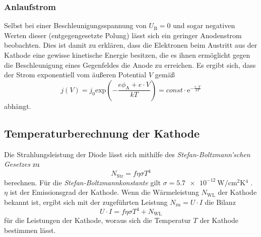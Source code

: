 \subsubsection{Anlaufstrom}
Selbst bei einer Beschleunigungsspannung von $U_\text{B} = 0$ und sogar negativen Werten dieser (entgegengesetzte Polung) lässt sich ein geringer Anodenstrom beobachten.
Dies ist damit zu erklären, dass die Elektronen beim Austritt aus der Kathode eine gewisse kinetische Energie besitzen, die es ihnen ermöglicht gegen die Beschleunigung
eines Gegenfeldes die Anode zu erreichen.
Es ergibt sich, dass der Strom exponentiell vom äußeren Potential $V$ gemäß
\begin{equation}
    \label{eqn:j_Anlauf}
    j(V) = j_0 \mathrm{exp}\left(-\frac{e\phi_\text{A} + e \cdot V}{kT} \right) = const \cdot \mathrm{e}^{-\frac{e \cdot V}{kT}}
\end{equation}
abhängt.

\subsection{Temperaturberechnung der Kathode}
\label{subsec:Temperatur_Kathode}
Die Strahlungsleistung der Diode lässt sich mithilfe des \textit{Stefan-Boltzmann'schen Gesetzes} zu 
\begin{equation*}
    N_\text{Str} = f \eta \sigma T^4
\end{equation*}
berechnen. Für die \textit{Stefan-Boltzmannkonstante} gilt $\sigma = \qty{5.7e-12}{\watt\per\centi\metre\squared\kelvin^4}$ \cite{scipy}. $\eta$ ist der Emissionsgrad
der Kathode. Wenn die Wärmeleistung $N_\text{WL}$ der Kathode bekannt ist, ergibt sich mit der zugeführten Leistung $N_\text{zu} = U \cdot I$ die Bilanz
\begin{equation}
    \label{eqn:Leistung}
    U \cdot I = f \eta \sigma T^4 + N_\text{WL}
\end{equation} 
für die Leistungen der Kathode, woraus sich die Temperatur $T$ der Kathode bestimmen lässt.
